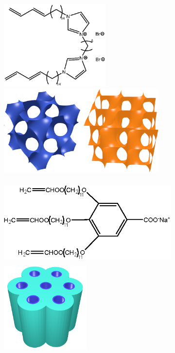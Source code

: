 \documentclass[journal=jpcbfk,manusciprt=article]{achemso}
\begin{document}
  \begin{figure}
  \centering
  \begin{subfigure}{0.45\textwidth}
        \centering
        \includegraphics[trim=-2cm 0 0 0, clip, height=4.5cm]{Dibrpyr14.eps}
        \includegraphics[height=4.5cm]{bcc_phases.png}
        \caption{}\label{fig:bcc_phases}
  \end{subfigure}
  \hspace{1cm}
  \begin{subfigure}{0.45\textwidth}
        \centering
        \includegraphics[trim=0 -0.5cm 0 -0.5cm, clip, height=4.5cm]{NaGA3C11.eps}
        \includegraphics[height=4.5cm]{hexagonal_packing.png}
        \caption{}\label{fig:hII_phase}
  \end{subfigure}

\end{figure}
\end{document}
